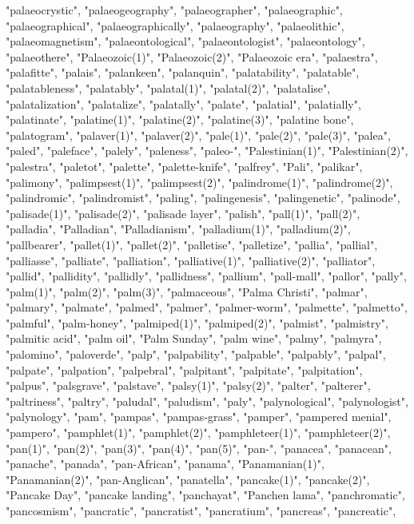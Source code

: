 "palaeocrystic",
"palaeogeography",
"palaeographer",
"palaeographic",
"palaeographical",
"palaeographically",
"palaeography",
"palaeolithic",
"palaeomagnetism",
"palaeontological",
"palaeontologist",
"palaeontology",
"palaeothere",
"Palaeozoic(1)",
"Palaeozoic(2)",
"Palaeozoic era",
"palaestra",
"palafitte",
"palais",
"palankeen",
"palanquin",
"palatability",
"palatable",
"palatableness",
"palatably",
"palatal(1)",
"palatal(2)",
"palatalise",
"palatalization",
"palatalize",
"palatally",
"palate",
"palatial",
"palatially",
"palatinate",
"palatine(1)",
"palatine(2)",
"palatine(3)",
"palatine bone",
"palatogram",
"palaver(1)",
"palaver(2)",
"pale(1)",
"pale(2)",
"pale(3)",
"palea",
"paled",
"paleface",
"palely",
"paleness",
"paleo-",
"Palestinian(1)",
"Palestinian(2)",
"palestra",
"paletot",
"palette",
"palette-knife",
"palfrey",
"Pali",
"palikar",
"palimony",
"palimpsest(1)",
"palimpsest(2)",
"palindrome(1)",
"palindrome(2)",
"palindromic",
"palindromist",
"paling",
"palingenesis",
"palingenetic",
"palinode",
"palisade(1)",
"palisade(2)",
"palisade layer",
"palish",
"pall(1)",
"pall(2)",
"palladia",
"Palladian",
"Palladianism",
"palladium(1)",
"palladium(2)",
"pallbearer",
"pallet(1)",
"pallet(2)",
"palletise",
"palletize",
"pallia",
"pallial",
"palliasse",
"palliate",
"palliation",
"palliative(1)",
"palliative(2)",
"palliator",
"pallid",
"pallidity",
"pallidly",
"pallidness",
"pallium",
"pall-mall",
"pallor",
"pally",
"palm(1)",
"palm(2)",
"palm(3)",
"palmaceous",
"Palma Christi",
"palmar",
"palmary",
"palmate",
"palmed",
"palmer",
"palmer-worm",
"palmette",
"palmetto",
"palmful",
"palm-honey",
"palmiped(1)",
"palmiped(2)",
"palmist",
"palmistry",
"palmitic acid",
"palm oil",
"Palm Sunday",
"palm wine",
"palmy",
"palmyra",
"palomino",
"paloverde",
"palp",
"palpability",
"palpable",
"palpably",
"palpal",
"palpate",
"palpation",
"palpebral",
"palpitant",
"palpitate",
"palpitation",
"palpus",
"palsgrave",
"palstave",
"palsy(1)",
"palsy(2)",
"palter",
"palterer",
"paltriness",
"paltry",
"paludal",
"paludism",
"paly",
"palynological",
"palynologist",
"palynology",
"pam",
"pampas",
"pampas-grass",
"pamper",
"pampered menial",
"pampero",
"pamphlet(1)",
"pamphlet(2)",
"pamphleteer(1)",
"pamphleteer(2)",
"pan(1)",
"pan(2)",
"pan(3)",
"pan(4)",
"pan(5)",
"pan-",
"panacea",
"panacean",
"panache",
"panada",
"pan-African",
"panama",
"Panamanian(1)",
"Panamanian(2)",
"pan-Anglican",
"panatella",
"pancake(1)",
"pancake(2)",
"Pancake Day",
"pancake landing",
"panchayat",
"Panchen lama",
"panchromatic",
"pancosmism",
"pancratic",
"pancratist",
"pancratium",
"pancreas",
"pancreatic",
